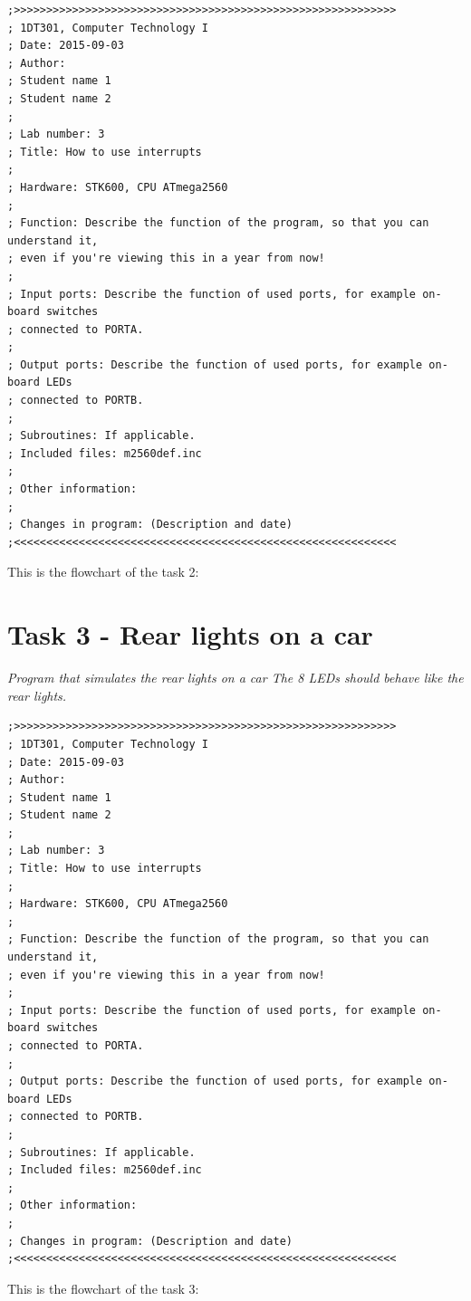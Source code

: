 \documentclass[a4paper,12pt]{article}
\begin{document}
\lstset{style=Asm}
\begin{lstlisting}
;>>>>>>>>>>>>>>>>>>>>>>>>>>>>>>>>>>>>>>>>>>>>>>>>>>>>>>>>>>>
; 1DT301, Computer Technology I
; Date: 2015-09-03
; Author:
; Student name 1
; Student name 2
;
; Lab number: 3
; Title: How to use interrupts
;
; Hardware: STK600, CPU ATmega2560
;
; Function: Describe the function of the program, so that you can understand it,
; even if you're viewing this in a year from now!
;
; Input ports: Describe the function of used ports, for example on-board switches
; connected to PORTA.
;
; Output ports: Describe the function of used ports, for example on-board LEDs
; connected to PORTB.
;
; Subroutines: If applicable.
; Included files: m2560def.inc
;
; Other information:
;
; Changes in program: (Description and date)
;<<<<<<<<<<<<<<<<<<<<<<<<<<<<<<<<<<<<<<<<<<<<<<<<<<<<<<<<<<<
\end{lstlisting}

This is the flowchart of the task 2:
\newpage
\begin{center}
\end{center}

\newpage
\section{Task 3 - Rear lights on a car}
\textit{Program that simulates the rear lights on a car
The 8 LEDs should behave like the rear lights.}

\lstset{style=Asm}
\begin{lstlisting}
;>>>>>>>>>>>>>>>>>>>>>>>>>>>>>>>>>>>>>>>>>>>>>>>>>>>>>>>>>>>
; 1DT301, Computer Technology I
; Date: 2015-09-03
; Author:
; Student name 1
; Student name 2
;
; Lab number: 3
; Title: How to use interrupts
;
; Hardware: STK600, CPU ATmega2560
;
; Function: Describe the function of the program, so that you can understand it,
; even if you're viewing this in a year from now!
;
; Input ports: Describe the function of used ports, for example on-board switches
; connected to PORTA.
;
; Output ports: Describe the function of used ports, for example on-board LEDs
; connected to PORTB.
;
; Subroutines: If applicable.
; Included files: m2560def.inc
;
; Other information:
;
; Changes in program: (Description and date)
;<<<<<<<<<<<<<<<<<<<<<<<<<<<<<<<<<<<<<<<<<<<<<<<<<<<<<<<<<<<
\end{lstlisting}

\newpage
This is the flowchart of the task 3:
\begin{center}
\end{center}
\end{document}
